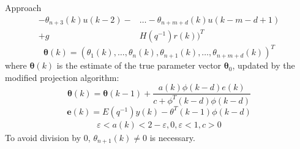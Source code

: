 \begin{section}{Approach}
\begin{align}
	-\theta_{n+3}(k)u(k-2)-& \dots - \theta_{n+m+d}(k)u(k-m-d+1) \nonumber \\
	+g&H(q^{-1})r(k))^T \nonumber
	\end{align}
	\begin{equation}
	\bm{\theta}(k)=(\theta_1(k), \dots ,\theta_n(k),\theta_{n+1}(k), \dots ,\theta_{n+m+d}(k))^T
	\end{equation}
where $\bm{\theta}(k)$ is the estimate of the true parameter vector $\bm{\theta}_0$, updated by the modified projection algorithm:
	\begin{equation}
	\bm{\theta}(k)=\bm{\theta}(k-1)+\frac{a(k)\phi(k-d)e(k)}{c+\phi^T(k-d)\phi(k-d)}
	\end{equation}
	\begin{equation}
	\bm{e}(k)=E(q^{-1})y(k)-\theta^T(k-1)\phi(k-d)
	\end{equation}
	\begin{align*}
	\varepsilon<a(k)<2-\varepsilon, 0,\varepsilon<1, c>0
	\end{align*}
To avoid division by $0$, $\theta_{n+1}(k)\neq0$ is necessary.


\end{section}
